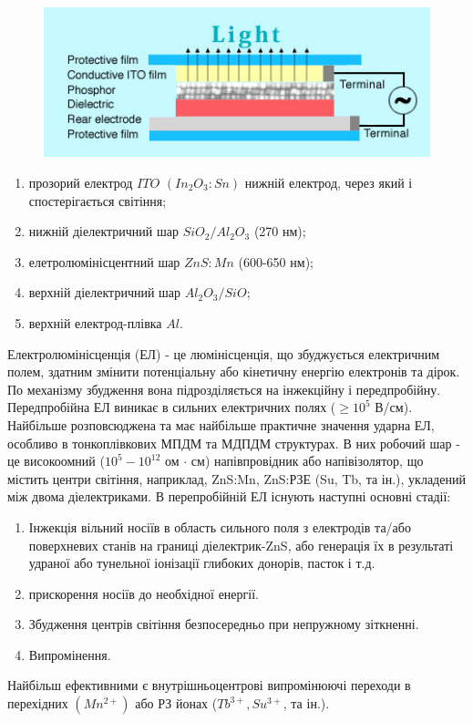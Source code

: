 \documentclass[a4paper, 14pt]{extarticle}
\begin{document}
\begin{figure}[H]
  \includegraphics[width=120mm]{./img/electroluminiscentTape.jpg}
\end{figure}

\begin{enumerate}
  \item прозорий електрод $ITO$ $(In_2 O_3: Sn)$ нижній електрод, через який і спостерігається світіння;
  \item нижній діелектричний шар $SiO_2/Al_2O_3$ (270 нм);
  \item елетролюмінісцентний шар $ZnS:Mn$ (600-650 нм);
  \item верхній діелектричний шар $Al_2 O_3/SiO$;
  \item верхній електрод-плівка $Al$.
\end{enumerate}

Електролюмінісценція (ЕЛ) - це люмінісценція, що збуджується електричним полем, здатним змінити потенціальну або кінетичну енергію електронів та дірок. По механізму збудження вона підрозділяється на інжекційну і передпробійну. Передпробійна ЕЛ виникає в сильних електричних полях ($\geq 10^5$ В/см). Найбільше розповсюджена та має найбільше практичне значення ударна ЕЛ, особливо в тонкоплівкових МПДМ та МДПДМ структурах. В них робочий шар - це високоомний ($10^5 - 10^{12}$ ом $\cdot$ см) напівпровідник або напівізолятор, що містить центри світіння, наприклад, ZnS:Mn, ZnS:РЗЕ (Su, Tb, та ін.), укладений між двома діелектриками. В перепробійній ЕЛ існують наступні основні стадії:
\begin{enumerate}
  \item Інжекція вільний носіїв в область сильного поля з електродів та/або поверхневих станів на границі діелектрик-ZnS, або генерація їх в результаті удраної або тунельної іонізації глибоких донорів, пасток і т.д.
  \item прискорення носіїв до необхідної енергії.
  \item Збудження центрів світіння безпосередньо при непружному зіткненні.
  \item Випромінення.
\end{enumerate}
Найбільш ефективними є внутрішньоцентрові випромінюючі переходи в перехідних $(Mn^{2+})$ або РЗ йонах ($Tb^{3+}, Su^{3+}$, та ін.).
\end{document}
